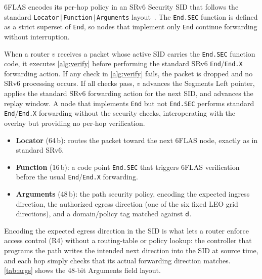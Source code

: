 6FLAS encodes its per-hop policy in an SRv6 Security SID that follows the
standard \texttt{Locator$\,|\,$Function$\,|\,$Arguments} layout~\cite{rfc8986}.
The \texttt{End.SEC} function is defined as a strict superset of \texttt{End},
so nodes that implement only \texttt{End} continue forwarding without
interruption.

\begin{definition}
\label{def:endsec}
When a router $v$ receives a packet whose active SID carries the \texttt{End.SEC}
function code, it executes \cref{alg:verify} before performing the standard
SRv6 \texttt{End}/\texttt{End.X} forwarding action. If any check in
\cref{alg:verify} fails, the packet is dropped and no SRv6 processing occurs.
If all checks pass, $v$ advances the Segments Left pointer, applies the standard
SRv6 forwarding action for the next SID, and advances the replay window. A node
that implements \texttt{End} but not \texttt{End.SEC} performs standard
\texttt{End}/\texttt{End.X} forwarding without the security checks, interoperating
with the overlay but providing no per-hop verification.
\end{definition}

\begin{itemize}
    \item \textbf{Locator} (64\,b): routes the packet toward the next 6FLAS node,
    exactly as in standard SRv6.
    \item \textbf{Function} (16\,b): a code point \texttt{End.SEC} that triggers
    6FLAS verification before the usual \texttt{End}/\texttt{End.X} forwarding.
    \item \textbf{Arguments} (48\,b): the path security policy, encoding the
    expected ingress direction, the authorized egress direction (one of the six
    fixed LEO grid directions), and a domain/policy tag matched against $\mathsf{d}$.
\end{itemize}

Encoding the expected egress direction in the SID is what lets a router enforce
access control (R4) without a routing-table or policy lookup: the controller
that programs the path writes the intended next direction into the SID at
source time, and each hop simply checks that its actual forwarding direction
matches. \cref{tab:args} shows the 48-bit Arguments field layout.

